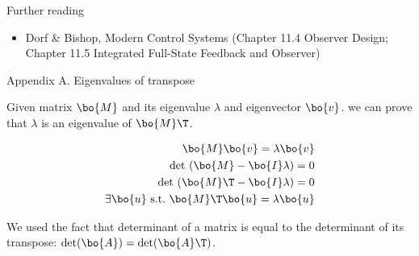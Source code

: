 \documentclass{beamer}
\begin{document}
\begin{frame}{Further reading}
	
	\begin{itemize}
		
		
		\item Dorf \& Bishop, Modern Control Systems (Chapter 11.4 Observer Design; Chapter 11.5 Integrated Full-State Feedback and Observer)		
		
		
	\end{itemize}
	
\end{frame}

\myqrframe



\begin{frame}{Appendix A. Eigenvalues of transpose}
	\begin{flushleft}
		
		Given matrix $\bo{M}$ and its eigenvalue $\lambda$ and eigenvector $\bo{v}$. we can prove that $\lambda$ is an eigenvalue of $\bo{M}\T$.
		
		\begin{align}
			\bo{M}\bo{v} = \lambda \bo{v} \\
			\text{det}\ (\bo{M}- \bo{I} \lambda) = 0 \\
			\text{det}\ (\bo{M}\T- \bo{I} \lambda) = 0 \\
			\exists \bo{u} \ \text{s.t.} \ \bo{M}\T\bo{u} = \lambda \bo{u}
		\end{align}
		
		We used the fact that determinant of a matrix is equal to the determinant of its transpose: $\text{det}(\bo{A}) = \text{det}(\bo{A}\T)$.
		
	\end{flushleft}
\end{frame}
\end{document}
